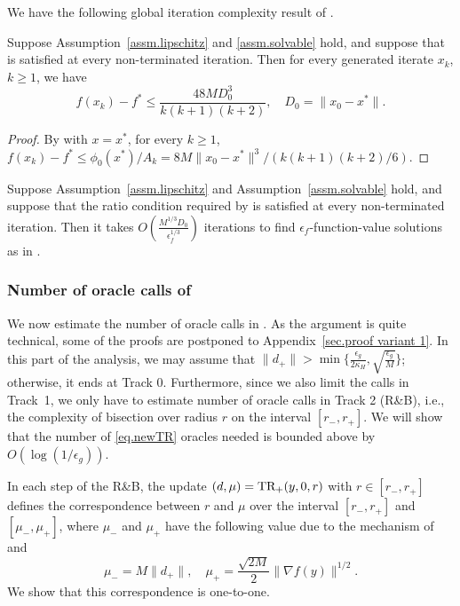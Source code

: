 \documentclass{article}
\begin{document}
We have the following global iteration complexity result of .
\begin{theorem}
    \label{thm.convergence outer loop}
    Suppose Assumption~\ref{assm.lipschitz} and \ref{assm.solvable}
    hold, and suppose that  is satisfied at every non-terminated
    iteration. Then for every generated iterate $x_k$, $k\geq 1$, we have
    \[
        f(x_k)-f^*
        \leq
        \frac{48MD_0^3}{k(k+1)(k+2)}, \quad D_0 = \|x_0-x^*\|.
    \]
\end{theorem}
\begin{proof}
    By  with $x=x^*$, for every $k\ge1$, $f(x_k)-f^*\le \phi_0(x^*)/A_k=8M\|x_0-x^*\|^3/(k(k+1)(k+2)/6).$
\end{proof}
\begin{corollary}
    \label{coro.function value complexity}
    Suppose Assumption~\ref{assm.lipschitz} and Assumption~\ref{assm.solvable}
    hold, and suppose that the ratio condition required by
     is satisfied at every non-terminated
    iteration. Then it takes  $O\left(\frac{M^{1/3}D_0}{\epsilon_f^{1/3}}\right)$ iterations to find $\epsilon_f$-function-value solutions as in .
\end{corollary}
\subsubsection{Number of oracle calls of }\label{sec.line search}
We now estimate the number of oracle calls in .
As the argument is quite technical, some of the proofs are postponed to Appendix~\ref{sec.proof variant 1}.
In this part of the analysis, we may assume that $\|d_+\| > \min\{\frac{\epsilon_g}{2\kappa_H},\sqrt{\frac{\epsilon_g}{M}}\}$; otherwise, it ends at {Track 0}. Furthermore, since we also limit the calls in {Track~1}, we only have to estimate number of oracle calls in Track 2 (R\&B), i.e., the complexity of bisection over radius $r$ on the interval $[r_-,r_+]$. %
We will show that the number of \ref{eq.newTR} oracles needed is bounded above by $O\left(\log\left(1/{\epsilon_g}\right)\right)$.

In each step of the R\&B, the update $(d,\mu)=\textrm{TR}_+(y,0,r)$ with $r\in[r_-,r_+]$ defines the correspondence between $r$ and $\mu$ over the interval $[r_-,r_+]$ and $[\mu_-,\mu_+]$, where $\mu_-$ and $\mu_+$ have the following value due to the mechanism of  and 
\begin{equation}\label{eq.value mu}
    \mu_- = M\|d_+\|, \quad \mu_+=\frac{\sqrt{2M}}{2}\|\nabla f(y)\|^{1/2}.
\end{equation}
We show that this correspondence is one-to-one.
\end{document}
